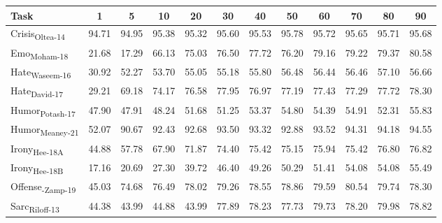 \begin{table*}[ht]
\small
\centering
\begin{tabular}{@{}lccccccccccc@{}}
\toprule
\textbf{Task}                                    & \textbf{1} & \textbf{5} & \textbf{10} & \textbf{20} & \textbf{30} & \textbf{40} & \textbf{50} & \textbf{60} & \textbf{70} & \textbf{80} & \textbf{90} \\ \midrule
Crisis\textsubscript{Oltea-14}  & 94.71      & 94.95      & 95.38       & 95.32       & 95.60       & 95.53       & 95.78       & 95.72       & 95.65       & 95.71       & 95.68       \\
Emo\textsubscript{Moham-18}     & 21.68      & 17.29      & 66.13       & 75.03       & 76.50       & 77.72       & 76.20       & 79.16       & 79.22       & 79.37       & 80.58       \\
Hate\textsubscript{Waseem-16}   & 30.92      & 52.27      & 53.70       & 55.05       & 55.18       & 55.80       & 56.48       & 56.44       & 56.46       & 57.10       & 56.66       \\
Hate\textsubscript{David-17}    & 29.21      & 69.18      & 74.17       & 76.58       & 77.95       & 76.97       & 77.19       & 77.43       & 77.29       & 77.72       & 78.30       \\
Humor\textsubscript{Potash-17}  & 47.90      & 47.91      & 48.24       & 51.68       & 51.25       & 53.37       & 54.80       & 54.39       & 54.91       & 52.31       & 55.83       \\
Humor\textsubscript{Meaney-21}  & 52.07      & 90.67      & 92.43       & 92.68       & 93.50       & 93.32       & 92.88       & 93.52       & 94.31       & 94.18       & 94.55       \\
Irony\textsubscript{Hee-18A}    & 44.88      & 57.78      & 67.90       & 71.87       & 74.40       & 75.42       & 75.15       & 75.94       & 75.42       & 76.80       & 76.82       \\
Irony\textsubscript{Hee-18B}    & 17.16      & 20.69      & 27.30       & 39.72       & 46.40       & 49.26       & 50.29       & 51.41       & 54.08       & 54.08       & 55.49       \\
Offense\textsubscript{-Zamp-19} & 45.03      & 74.68      & 76.49       & 78.02       & 79.26       & 78.55       & 78.86       & 79.59       & 80.54       & 79.74       & 78.30       \\
Sarc\textsubscript{Riloff-13}   & 44.38      & 43.99      & 44.88       & 43.99       & 77.89       & 78.23       & 77.73       & 79.73       & 78.20       & 79.98       & 78.82       \\

\end{tabular}
\end{table*}
